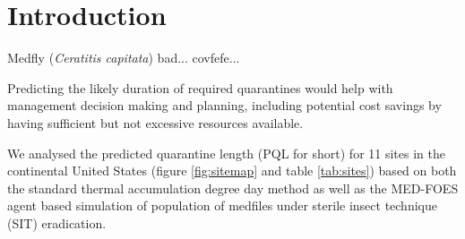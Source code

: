 \documentclass[10pt,a4paper,twocolumn]{article}
\begin{document}






\section*{Introduction}

Medfly (\textit{Ceratitis capitata}) bad... covfefe...

Predicting the likely duration of required quarantines would help with
management decision making and planning,
including potential cost savings by having sufficient but not excessive
resources available.

We analysed the predicted quarantine length (PQL for short) 
for 11 sites
in the continental United States
(figure \ref{fig:sitemap} and table \ref{tab:sites})
based on both the standard thermal accumulation degree day method\cite{ECY:ECY1969503514} 
as well as the MED-FOES\cite{manoukis_computer_2014} agent based simulation of 
population of medfiles under sterile insect technique (SIT)\cite{??} eradication.
\end{document}
